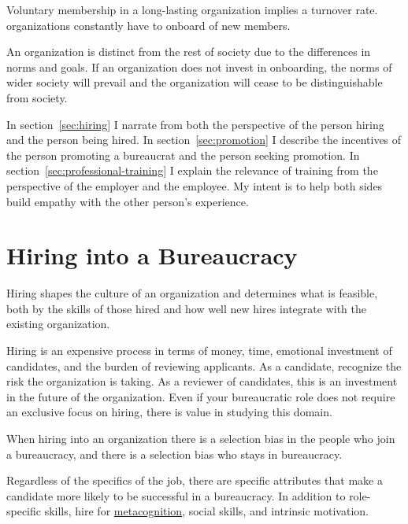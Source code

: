 
Voluntary membership in a long-lasting organization implies a turnover rate. organizations constantly have to onboard of new members.

An organization is distinct from the rest of society due to the differences in norms and goals. If an organization does not invest in onboarding, the norms of wider society will prevail and the organization will cease to be distinguishable from society.

In section~\ref{sec:hiring} I narrate from both the perspective of the person hiring and the person being hired. In section~\ref{sec:promotion} I describe the incentives of the person promoting a bureaucrat and the person seeking promotion. In section~\ref{sec:professional-training} I explain the relevance of training from the perspective of the employer and the employee. My intent is to help both sides build empathy with the other person's experience. 


\section{Hiring into a Bureaucracy\label{sec:hiring}}


Hiring shapes the culture of an organization and determines what is feasible, both by the skills of those hired and how well new hires integrate with the existing organization. 

Hiring is an expensive process in terms of money, time, emotional investment of candidates, and the burden of reviewing applicants. 
As a candidate, recognize the risk the organization is taking. 
As a reviewer of candidates, this is an investment in the future of the organization. Even if your bureaucratic role does not require an exclusive focus on hiring, there is value in studying this domain. 

When hiring into an organization there is a selection bias in the people who join a bureaucracy, and there is a selection bias who stays in bureaucracy. 


Regardless of the specifics of the job, there are specific attributes that make a candidate more likely to be successful in a bureaucracy. In addition to role-specific skills, hire for \href{https://en.wikipedia.org/wiki/Metacognition}{metacognition}, social skills, and intrinsic motivation.




